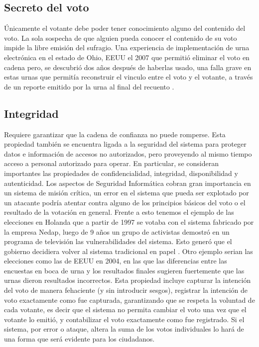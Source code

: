 \subsection{Secreto del voto}
Únicamente el votante debe poder tener conocimiento alguno del contenido del voto. La sola sospecha de que alguien pueda conocer el contenido de su voto impide la libre emisión del sufragio.
Una experiencia de implementación de urna electrónica en el estado de Ohio, EEUU el 2007 que permitió eliminar el voto en cadena pero, se descubrió dos años después de haberlas usado, una falla grave en estas urnas que permitía reconstruir el vinculo entre el voto y el votante, a través de un reporte emitido por la urna al final del recuento \cite{mcdaniel2007everest}.

\subsection{Integridad}
Requiere garantizar que la cadena de confianza no puede romperse. Esta propiedad también se encuentra ligada a la seguridad del sistema para proteger datos e información de accesos no autorizados, pero proveyendo al mismo tiempo acceso a personal autorizado para operar. En particular, se consideran importantes las propiedades de confidencialidad, integridad, disponibilidad y autenticidad. Los aspectos de Seguridad Informática cobran gran importancia en un sistema de misión crítica, un error en el sistema que pueda ser explotado por un atacante podría atentar contra alguno de los principios básicos del voto o el resultado de la votación en general. Frente a esto tenemos el ejemplo de las elecciones en Holanda que a partir de 1997 se votaba con el sistema fabricado por la empresa Nedap, luego de 9 años un grupo de activistas demostró en un programa de televisión las vulnerabilidades del sistema. Esto generó que el gobierno decidiera volver al sistema tradicional en papel \cite{eleccionesHolanda}. Otro ejemplo serian las elecciones como las de EEUU en 2004, en las que las diferencias entre las encuestas en boca de urna y los resultados finales sugieren fuertemente que las urnas dieron resultados incorrectos.\newline
Esta propiedad incluye capturar la intención del voto de manera fehaciente (y sin introducir sesgos), registrar la intención de voto exactamente como fue capturada, garantizando que se respeta la voluntad de cada votante, es decir que el sistema no permita cambiar el voto una vez que el votante lo emitió, y contabilizar el voto exactamente como fue registrado. Si el sistema, por error o ataque, altera la suma de los votos individuales lo hará de una forma que será evidente para los ciudadanos.

